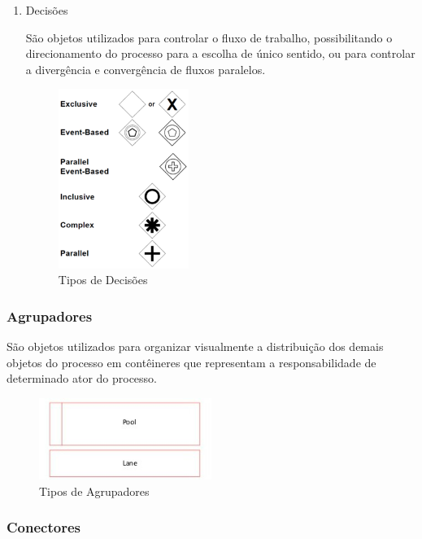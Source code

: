 \begin{enumerate}
    \item Decisões
    
    São objetos utilizados para controlar o fluxo de trabalho, possibilitando o direcionamento do processo para a escolha de único sentido, ou para controlar a divergência e convergência de fluxos paralelos.
    
    \begin{figure}[H]
    \centering
    \includegraphics[width=0.4\textwidth]{imagens/bpmn_gateways.png}
    \caption{Tipos de Decisões}
    \label{fig:bpmn_gateways}
    \end{figure}
\end{enumerate}


\subsubsection{Agrupadores}\label{sec:automatizacao_processos-bpmn_objetos_agrupadores}

    São objetos utilizados para organizar visualmente a distribuição dos demais objetos do processo em contêineres que representam a responsabilidade de determinado ator do processo.

    \begin{figure}[H]
    \centering
    \includegraphics[width=0.5\textwidth]{imagens/bpmn_swimlanes.jpg}
    \caption{Tipos de Agrupadores}
    \label{fig:bpmn_swimlanes}
    \end{figure}

\subsubsection{Conectores}\label{sec:automatizacao_processos-bpmn_objetos_conectores}

